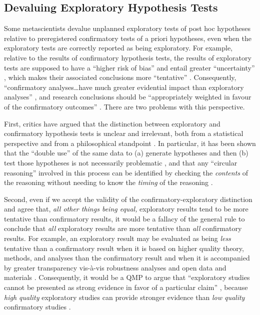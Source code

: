 \documentclass[authordate, meta]{jote-new-article}
\begin{document}
\subsection{Devaluing Exploratory Hypothesis Tests}



Some metascientists devalue unplanned exploratory tests of post hoc hypotheses relative to preregistered confirmatory tests of a priori hypotheses, even when the exploratory tests are correctly reported as being exploratory. For example, relative to the results of confirmatory hypothesis tests, the results of exploratory tests are supposed to have a “higher risk of bias” \parencites[p. 19]{Hardwicke2023} and entail greater “uncertainty” \parencites[p. 2601]{Nosek2018}, which makes their associated conclusions more “tentative” \parencites[p. 19]{Errington2021a}[p. 238]{Ioannidis2014}[p. 519]{Nelson2018}[p. 138]{Nosek2014}[p. 154]{Simmons2021}. Consequently, “confirmatory analyses…have much greater evidential impact than exploratory analyses” \parencites[p. 13]{Wagenmakers2012}, and research conclusions should be “appropriately weighted in favour of the confirmatory outcomes” \parencites[p. 36]{Chambers2022}. There are two problems with this perspective.



First, critics have argued that the distinction between exploratory and confirmatory hypothesis tests is unclear and irrelevant, both from a statistical perspective \parencites{Devezer2021}{Rubin2020}{Rubin2021b} and from a philosophical standpoint \parencites{Rubin2020}{Rubin2022}{Rubin2022a}{Szollosi2021}. In particular, it has been shown that the “double use” of the same data to (a) generate hypotheses and then (b) test those hypotheses is not necessarily problematic \parencites{Devezer2021}, and that any “circular reasoning” involved in this process can be identified by checking the \emph{contents} of the reasoning without needing to know the \emph{timing} of the reasoning \parencites{Rubin2022a}.



Second, even if we accept the validity of the confirmatory-exploratory distinction and agree that, \emph{all other things being equal,} exploratory results tend to be more tentative than confirmatory results, it would be a fallacy of the general rule to conclude that \emph{all} exploratory results are more tentative than \emph{all} confirmatory results. For example, an exploratory result may be evaluated as being \emph{less} tentative than a confirmatory result when it is based on higher quality theory, methods, and analyses than the confirmatory result and when it is accompanied by greater transparency vis-à-vis robustness analyses and open data and materials \parencites{Devezer2021}{Morey2019}{Rubin2020}{Szollosi2020}. Consequently, it would be a QMP to argue that “exploratory studies cannot be presented as strong evidence in favor of a particular claim” \parencites[p. 635]{Wagenmakers2012a}, because \emph{high quality} exploratory studies can provide stronger evidence than \emph{low quality} confirmatory studies \parencites[see also][p. 314]{Rubin2017b}.
\end{document}
